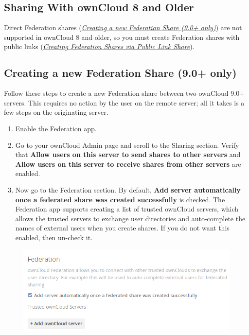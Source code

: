 \documentclass[letterpaper,10pt,english]{sphinxmanual}
\begin{document}
\subsection{Sharing With ownCloud 8 and Older}
\label{configuration_files/federated_cloud_sharing_configuration:sharing-with-owncloud-8-and-older}
Direct Federation shares ({\hyperref[configuration_files/federated_cloud_sharing_configuration:label-direct-share-link]{\emph{Creating a new Federation Share (9.0+ only)}}}) are not supported in
ownCloud 8 and older, so you must create Federation shares with public links
({\hyperref[configuration_files/federated_cloud_sharing_configuration:label-public-link-share]{\emph{Creating Federation Shares via Public Link Share}}}).


\subsection{Creating a new Federation Share (9.0+ only)}
\label{configuration_files/federated_cloud_sharing_configuration:label-direct-share-link}\label{configuration_files/federated_cloud_sharing_configuration:creating-a-new-federation-share-9-0-only}
Follow these steps to create a new Federation share between two ownCloud 9.0+
servers. This requires no action by the user on the remote server; all it takes
is a few steps on the originating server.
\begin{enumerate}
\item {} 
Enable the Federation app.

\item {} 
Go to your ownCloud Admin page and scroll to the Sharing
section. Verify that \textbf{Allow users on this server to send shares to other
servers} and \textbf{Allow users on this server to receive shares from other
servers} are enabled.

\item {} 
Now go to the Federation
section. By default, \textbf{Add server automatically once a federated share was
created successfully} is checked. The Federation app supports creating a
list of trusted ownCloud servers, which allows the trusted servers to
exchange user directories and auto-complete the names of external users when
you create shares. If you do not want this enabled, then un-check it.

\end{enumerate}
\begin{figure}[htbp]
\centering

\includegraphics{federation-0.png}
\end{figure}
\end{document}
